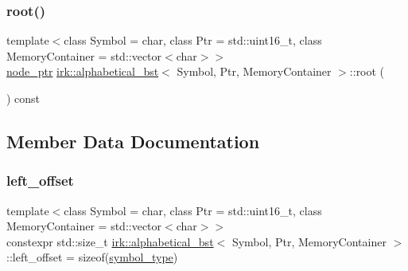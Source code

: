 \mbox{\label{classirk_1_1alphabetical__bst_a28fa90a8d7eec6045a035c44e93a1a13}} 
\subsubsection{\texorpdfstring{root()}{root()}}
{\footnotesize\ttfamily template$<$class Symbol = char, class Ptr = std\+::uint16\+\_\+t, class Memory\+Container = std\+::vector$<$char$>$$>$ \\
\mbox{\hyperlink{structirk_1_1alphabetical__bst_1_1node__ptr}{node\+\_\+ptr}} \mbox{\hyperlink{classirk_1_1alphabetical__bst}{irk\+::alphabetical\+\_\+bst}}$<$ Symbol, Ptr, Memory\+Container $>$\+::root (\begin{DoxyParamCaption}{ }\end{DoxyParamCaption}) const\hspace{0.3cm}{\ttfamily [inline]}}



\subsection{Member Data Documentation}
\mbox{\label{classirk_1_1alphabetical__bst_a0cc871d4fcdf8a37436594bc32eec076}} 
\subsubsection{\texorpdfstring{left\+\_\+offset}{left\_offset}}
{\footnotesize\ttfamily template$<$class Symbol = char, class Ptr = std\+::uint16\+\_\+t, class Memory\+Container = std\+::vector$<$char$>$$>$ \\
constexpr std\+::size\+\_\+t \mbox{\hyperlink{classirk_1_1alphabetical__bst}{irk\+::alphabetical\+\_\+bst}}$<$ Symbol, Ptr, Memory\+Container $>$\+::left\+\_\+offset = sizeof(\mbox{\hyperlink{classirk_1_1alphabetical__bst_a296ccb8fa9fa9dce3b3c3beab0a5ca28}{symbol\+\_\+type}})\hspace{0.3cm}{\ttfamily [static]}}

\mbox{\label{classirk_1_1alphabetical__bst_a6f7d3f7002730eb7840e449d4d371235}} 

